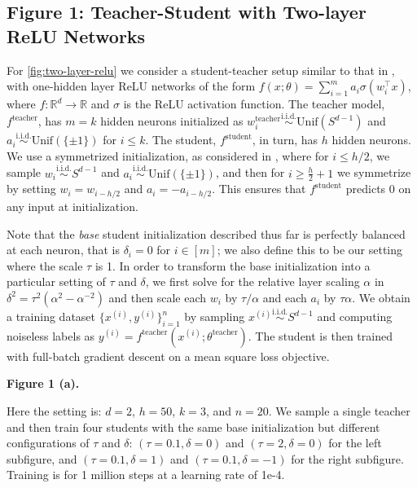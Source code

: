 \documentclass{article}
\theoremstyle{plain}
\theoremstyle{definition}
\theoremstyle{remark}
\begin{document}
\subsection{Figure 1: Teacher-Student with Two-layer ReLU Networks}
\label{app:experimental-details-two-layer}
For \cref{fig:two-layer-relu} we consider a student-teacher setup similar to that in \cite{chizat2019lazy}, with one-hidden layer ReLU networks of the form $f(x;\theta) = \sum_{i=1}^m a_i \sigma(w_i^\intercal x)$, where $f:\mathbb{R}^d\to\mathbb{R}$ and $\sigma$ is the ReLU activation function. The teacher model, $f^\mathrm{teacher}$, has $m=k$ hidden neurons initialized as $w^\mathrm{teacher}_i \overset{\text{i.i.d.}}{\sim} \mathrm{Unif}(S^{d-1})$ and $a_i \overset{\text{i.i.d.}}{\sim} \mathrm{Unif}(\{\pm1\})$ for $i \leq k$.
The student, $f^\mathrm{student}$, in turn, has $h$ hidden neurons. We use a symmetrized initialization, as considered in \cite{chizat2019lazy}, where for $i \leq h/2$, we sample $w_i \overset{\text{i.i.d.}}{\sim} S^{d-1}$ and $a_i \overset{\text{i.i.d.}}{\sim} \mathrm{Unif}(\{\pm1\})$, and then for $i \geq \frac{h}{2} + 1$ we symmetrize by setting $w_i = w_{i - h/2}$ and $a_i = -a_{i - h/2}$. This ensures that $f^\mathrm{student}$ predicts 0 on any input at initialization.

Note that the \textit{base} student initialization described thus far is perfectly balanced at each neuron, that is $\delta_i = 0$ for $i \in [m]$; we also define this to be our setting where the scale $\tau$ is 1. In order to transform the base initialization into a particular setting of $\tau$ and $\delta$, we first solve for the relative layer scaling $\alpha$ in $\delta^2 = \tau^2 (\alpha^2 - \alpha^{-2})$ and then scale each $w_i$ by $\tau/\alpha$ and each $a_i$ by $\tau\alpha$.
%
We obtain a training dataset $\{x^{(i)}, y^{(i)}\}_{i=1}^n$ by sampling $x^{(i)} \overset{\text{i.i.d.}}{\sim} S^{d-1}$ and computing noiseless labels as $y^{(i)} = f^\mathrm{teacher}(x^{(i)};\theta^\mathrm{teacher})$. The student is then trained with full-batch gradient descent on a mean square loss objective.

\textbf{Figure 1 (a).}

Here the setting is: $d=2$, $h=50$, $k=3$, and $n=20$. We sample a single teacher and then train four students with the same base initialization but different configurations of $\tau$ and $\delta$: $(\tau=0.1, \delta=0)$ and $(\tau=2, \delta=0)$ for the left subfigure, and $(\tau=0.1, \delta=1)$ and $(\tau=0.1, \delta=-1)$ for the right subfigure. Training is for 1 million steps at a learning rate of 1e-4.
\end{document}
